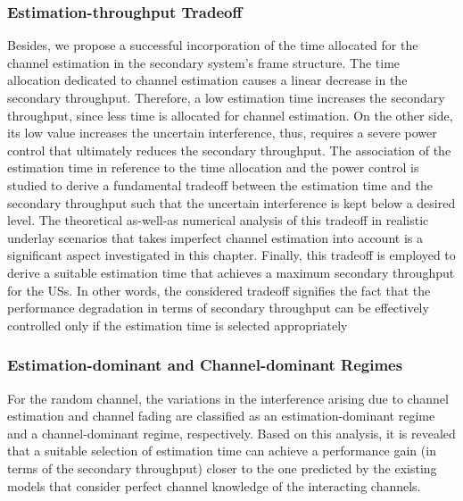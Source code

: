 \subsubsection{Estimation-throughput Tradeoff}
Besides, we propose a successful incorporation of the time allocated for the channel estimation in the secondary system's frame structure. The time allocation dedicated to channel estimation causes a linear decrease in the secondary throughput. Therefore, a low estimation time increases the secondary throughput, since less time is allocated for channel estimation. On the other side, its low value increases the uncertain interference, thus, requires a severe power control that ultimately reduces the secondary throughput. The association of the estimation time in reference to the time allocation and the power control is studied to derive a fundamental tradeoff between the estimation time and the secondary throughput such that the uncertain interference is kept below a desired level. The theoretical as-well-as numerical analysis of this tradeoff in realistic underlay scenarios that takes imperfect channel estimation into account is a significant aspect investigated in this chapter. Finally, this tradeoff is employed to derive a suitable estimation time that achieves a maximum secondary throughput for the USs. In other words, the considered tradeoff signifies the fact that the performance degradation in terms of secondary throughput can be effectively controlled only if the estimation time is selected appropriately

\subsubsection{Estimation-dominant and Channel-dominant Regimes}
For the random channel, the variations in the interference arising due to channel estimation and channel fading are classified as an estimation-dominant regime and a channel-dominant regime, respectively. Based on this analysis, it is revealed that a suitable selection of estimation time can achieve a performance gain (in terms of the secondary throughput) closer to the one predicted by the existing models that consider perfect channel knowledge of the interacting channels.



